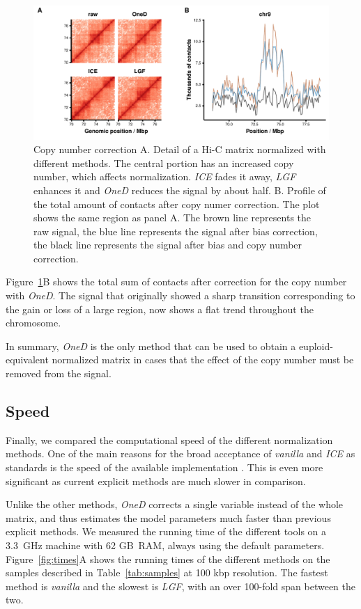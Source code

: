 \documentclass{bioinfo}
\begin{document}
\begin{figure}
\centerline{\includegraphics[width=.5\textwidth]
  {img/figure_cnv_correction.pdf}}
\caption{
Copy number correction A. Detail of a Hi-C matrix normalized with
different methods. The central portion has an increased copy number, which
affects normalization. \textit{ICE} fades it away, \textit{LGF} enhances
it and \textit{OneD} reduces the signal by about half. B. Profile of the
total amount of contacts after copy numer correction. The plot shows the
same region as panel A. The brown line represents the raw
signal, the blue line represents the signal after bias correction, the
black line represents the signal after bias and copy number correction.}
\label{fig:cnv_correction}
\end{figure}

Figure~\ref{fig:cnv_correction}B shows the total sum of contacts after
correction for the copy number with \textit{OneD}. The signal that
originally showed a sharp transition corresponding to the gain or loss of
a large region, now shows a flat trend throughout the chromosome.

In summary, \textit{OneD} is the only method that can be used to obtain a
euploid-equivalent normalized matrix in cases that the effect of the copy
number must be removed from the signal.



\subsection{Speed}

Finally, we compared the computational speed of the different
normalization methods. One of the main reasons for the broad acceptance of
\textit{vanilla} and \textit{ICE} as standards is the speed of the
available implementation \citep{imakaev2012iterative}. This is even more
significant as current explicit methods \citep{servant2012hitc} are much
slower in comparison.

Unlike the other methods, \textit{OneD} corrects a single variable instead
of the whole matrix, and thus estimates the model parameters much faster
than previous explicit methods. We measured the running time of the
different tools on a 3.3~GHz machine with 62 GB~RAM, always using the
default parameters. Figure~\ref{fig:times}A shows the running times of the
different methods on the samples described in Table~\ref{tab:samples} at
100 kbp resolution. The fastest method is \textit{vanilla} and the slowest
is \textit{LGF}, with an over 100-fold span between the two.
\end{document}

